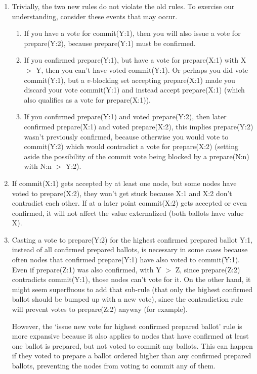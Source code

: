 \begin{enumerate}
    \item Trivially, the two new rules do not violate the old rules. To exercise our understanding, consider these events that may occur.
    \begin{enumerate}
        \item If you have a vote for commit(Y:1), then you will also issue a vote for prepare(Y:2), because prepare(Y:1) must be confirmed.

        \item If you confirmed prepare(Y:1), but have a vote for prepare(X:1) with X $>$ Y, then you can't have voted commit(Y:1). Or perhaps you did vote commit(Y:1), but a $v$-blocking set accepting prepare(X:1) made you discard your vote commit(Y:1) and instead accept prepare(X:1) (which also qualifies as a vote for prepare(X:1)).

        \item If you confirmed prepare(Y:1) and voted prepare(Y:2), then later confirmed prepare(X:1) and voted prepare(X:2), this implies prepare(Y:2) wasn't previously confirmed, because otherwise you would vote to commit(Y:2) which would contradict a vote for prepare(X:2) (setting aside the possibility of the commit vote being blocked by a prepare(N:n) with N:n $>$ Y:2).
    \end{enumerate}

    \item If commit(X:1) gets accepted by at least one node, but some nodes have voted to prepare(X:2), they won't get stuck because X:1 and X:2 don't contradict each other. If at a later point commit(X:2) gets accepted or even confirmed, it will not affect the value externalized (both ballots have value X).

    \item Casting a vote to prepare(Y:2) for the highest confirmed prepared ballot Y:1, instead of all confirmed prepared ballots, is necessary in some cases because often nodes that confirmed prepare(Y:1) have also voted to commit(Y:1). Even if prepare(Z:1) was also confirmed, with Y $>$ Z, since prepare(Z:2) contradicts commit(Y:1), those nodes can't vote for it. On the other hand, it might seem superfluous to add that sub-rule (that only the highest confirmed ballot should be bumped up with a new vote), since the contradiction rule will prevent votes to prepare(Z:2) anyway (for example).

    However, the `issue new vote for highest confirmed prepared ballot' rule is more expansive because it also applies to nodes that have confirmed at least one ballot is prepared, but not voted to commit any ballots. This can happen if they voted to prepare a ballot ordered higher than any confirmed prepared ballots, preventing the nodes from voting to commit any of them.


\end{enumerate}
